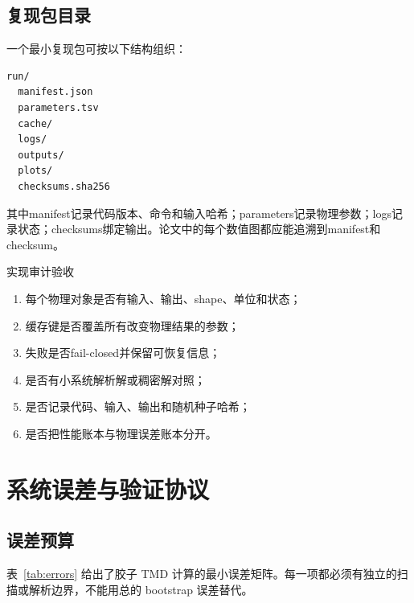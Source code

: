 \documentclass[UTF8,12pt,a4paper,twoside,openany]{ctexbook}
\begin{document}
\section{复现包目录}

一个最小复现包可按以下结构组织：
\begin{verbatim}
run/
  manifest.json
  parameters.tsv
  cache/
  logs/
  outputs/
  plots/
  checksums.sha256
\end{verbatim}
其中manifest记录代码版本、命令和输入哈希；parameters记录物理参数；logs记录状态；checksums绑定输出。论文中的每个数值图都应能追溯到manifest和checksum。

\begin{checkpointbox}{实现审计验收}
\begin{enumerate}
  \item 每个物理对象是否有输入、输出、shape、单位和状态；
  \item 缓存键是否覆盖所有改变物理结果的参数；
  \item 失败是否fail-closed并保留可恢复信息；
  \item 是否有小系统解析解或稠密解对照；
  \item 是否记录代码、输入、输出和随机种子哈希；
  \item 是否把性能账本与物理误差账本分开。
\end{enumerate}
\end{checkpointbox}

\clearpage


\clearpage


\clearpage


\clearpage
\chapter{系统误差与验证协议}

\section{误差预算}

表~\ref{tab:errors} 给出了胶子 TMD 计算的最小误差矩阵。每一项都必须有独立的扫描或解析边界，不能用总的 bootstrap 误差替代。
\end{document}
